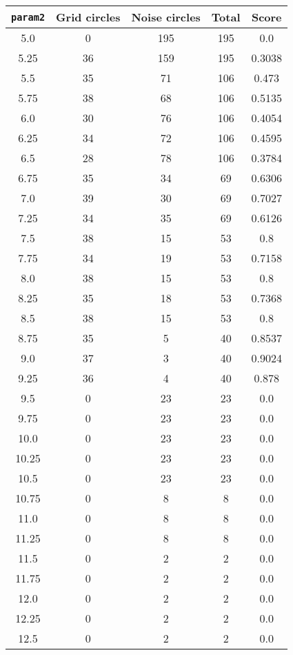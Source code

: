 \documentclass[letterpaper, 12pt]{article}
\begin{document}
\begin{longtable}{|c|c|c|c|c|}
\hline
\textbf{\texttt{param2}} & \textbf{Grid circles} & \textbf{Noise circles} & \textbf{Total} & \textbf{Score} \\
\hline
5.0 & 0 & 195 & 195 & 0.0 \\
\hline
5.25 & 36 & 159 & 195 & 0.3038 \\
\hline
5.5 & 35 & 71 & 106 & 0.473 \\
\hline
5.75 & 38 & 68 & 106 & 0.5135 \\
\hline
6.0 & 30 & 76 & 106 & 0.4054 \\
\hline
6.25 & 34 & 72 & 106 & 0.4595 \\
\hline
6.5 & 28 & 78 & 106 & 0.3784 \\
\hline
6.75 & 35 & 34 & 69 & 0.6306 \\
\hline
7.0 & 39 & 30 & 69 & 0.7027 \\
\hline
7.25 & 34 & 35 & 69 & 0.6126 \\
\hline
7.5 & 38 & 15 & 53 & 0.8 \\
\hline
7.75 & 34 & 19 & 53 & 0.7158 \\
\hline
8.0 & 38 & 15 & 53 & 0.8 \\
\hline
8.25 & 35 & 18 & 53 & 0.7368 \\
\hline
8.5 & 38 & 15 & 53 & 0.8 \\
\hline
8.75 & 35 & 5 & 40 & 0.8537 \\
\hline
9.0 & 37 & 3 & 40 & 0.9024 \\
\hline
9.25 & 36 & 4 & 40 & 0.878 \\
\hline
9.5 & 0 & 23 & 23 & 0.0 \\
\hline
9.75 & 0 & 23 & 23 & 0.0 \\
\hline
10.0 & 0 & 23 & 23 & 0.0 \\
\hline
10.25 & 0 & 23 & 23 & 0.0 \\
\hline
10.5 & 0 & 23 & 23 & 0.0 \\
\hline
10.75 & 0 & 8 & 8 & 0.0 \\
\hline
11.0 & 0 & 8 & 8 & 0.0 \\
\hline
11.25 & 0 & 8 & 8 & 0.0 \\
\hline
11.5 & 0 & 2 & 2 & 0.0 \\
\hline
11.75 & 0 & 2 & 2 & 0.0 \\
\hline
12.0 & 0 & 2 & 2 & 0.0 \\
\hline
12.25 & 0 & 2 & 2 & 0.0 \\
\hline
12.5 & 0 & 2 & 2 & 0.0 \\
\hline

\end{longtable}
\end{document}
